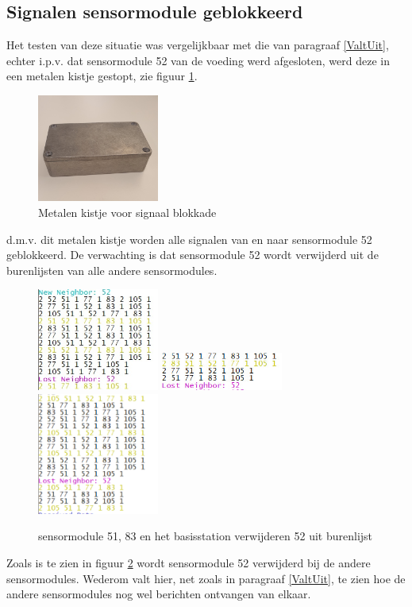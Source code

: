 \documentclass[a4paper, 11pt]{article}
\begin{document}
\subsection{Signalen sensormodule geblokkeerd}
Het testen van deze situatie was vergelijkbaar met die van paragraaf \ref{ValtUit}, echter i.p.v. dat sensormodule 52 van de voeding werd afgesloten, werd deze in een metalen kistje gestopt, zie figuur \ref{kistje}.
\newpage
\begin{figure}[h!p]
	\centering
	\includegraphics[width=4cm]{media/kistje.jpg}
	\caption{Metalen kistje voor signaal blokkade} \label{kistje}
\end{figure}
d.m.v. dit metalen kistje worden alle signalen van en naar sensormodule 52 geblokkeerd. De verwachting is dat sensormodule 52 wordt verwijderd uit de burenlijsten van alle andere sensormodules.
\begin{figure}[h!p]
	\centering
	\includegraphics[width=4cm]{TestResults/FaradayKooi/51_Blokkade.jpeg}\hfill
	\includegraphics[width=4cm]{TestResults/FaradayKooi/83_Blokkade.jpeg}\hfill
	\includegraphics[width=4cm]{TestResults/FaradayKooi/105_verliest_52.png}
	\caption{sensormodule 51, 83 en het basisstation verwijderen 52 uit burenlijst} \label{faradayBlock}
\end{figure}
Zoals is te zien in figuur \ref{faradayBlock} wordt sensormodule 52 verwijderd bij de andere sensormodules. Wederom valt hier, net zoals in paragraaf \ref{ValtUit}, te zien hoe de andere sensormodules nog wel berichten ontvangen van elkaar.
\end{document}
